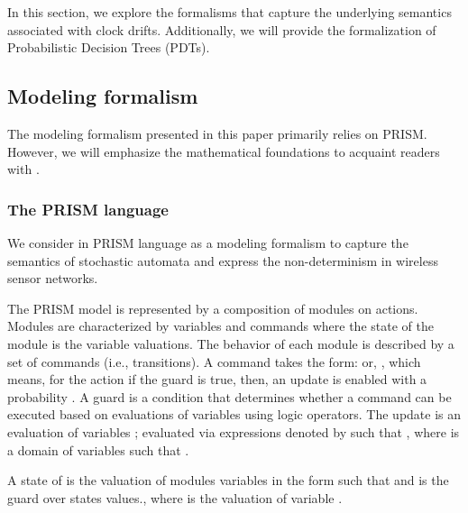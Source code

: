 In this section, we explore the formalisms that capture the underlying semantics associated with clock drifts. Additionally, we will provide the formalization of Probabilistic Decision Trees (PDTs).


\subsection{Modeling formalism}
The modeling formalism presented in this paper primarily relies on PRISM. However, we will emphasize the mathematical foundations to acquaint readers with .

\subsubsection{The PRISM language}
\label{sec:prism:rappel}
We consider  in PRISM language \cite{Kwiatkowskaprism2011} as a modeling formalism to capture the semantics of stochastic automata and express the non-determinism in wireless sensor networks. 

The PRISM model  is represented by a composition of modules on actions. Modules are characterized by variables and commands where the state of the module is the variable valuations. The behavior of each module is described by a set of commands (i.e., transitions). A command takes the form:  or, , which means, for the action  if the guard  is true, then, an update  is enabled with a probability . A guard is a condition that determines whether a command can be executed based on evaluations of variables using logic operators. The update  is an evaluation of variables ; evaluated via expressions denoted by \quot{\emath{\theta}} such that , where  is a domain of variables such that .


\begin{mydef} \label{def:prismstate} A state of   is the valuation  of   modules variables  in the form  such that  and  is the guard over states values., where  is the valuation of variable .
\end{mydef}



